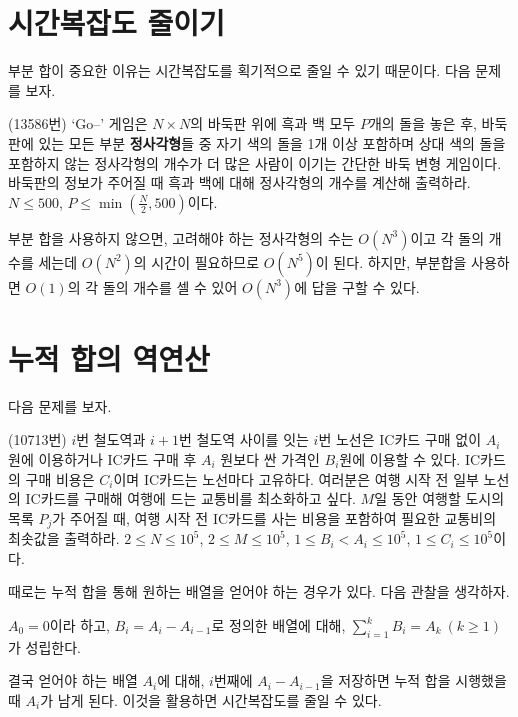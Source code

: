 \section{시간복잡도 줄이기}

부분 합이 중요한 이유는 시간복잡도를 획기적으로 줄일 수 있기 때문이다. 다음 문제를 보자.

\begin{example}
    (13586번) `Go--' 게임은 $N \times N$의 바둑판 위에 흑과 백 모두 $P$개의 돌을 놓은 후, 바둑판에 있는 모든 부분 \textbf{정사각형}들 중 자기 색의 돌을 1개 이상 포함하며 상대 색의 돌을 포함하지 않는 정사각형의 개수가 더 많은 사람이 이기는 간단한 바둑 변형 게임이다. 바둑판의 정보가 주어질 때 흑과 백에 대해 정사각형의 개수를 계산해 출력하라. $N \leq 500$, $P \leq \min(\frac{N}{2}, 500)$이다.
\end{example}

부분 합을 사용하지 않으면, 고려해야 하는 정사각형의 수는 $O(N^3)$이고 각 돌의 개수를 세는데 $O(N^2)$의 시간이 필요하므로 $O(N^5)$이 된다. 하지만, 부분합을 사용하면 $O(1)$의 각 돌의 개수를 셀 수 있어 $O(N^3)$에 답을 구할 수 있다.

\section{누적 합의 역연산}

다음 문제를 보자.

\begin{example}
    (10713번) $i$번 철도역과 $i+1$번 철도역 사이를 잇는 $i$번 노선은 IC카드 구매 없이 $A_i$원에 이용하거나 IC카드 구매 후 $A_i$ 원보다 싼 가격인 $B_i$원에 이용할 수 있다. IC카드의 구매 비용은 $C_i$이며 IC카드는 노선마다 고유하다. 여러분은 여행 시작 전 일부 노선의 IC카드를 구매해 여행에 드는 교통비를 최소화하고 싶다. $M$일 동안 여행할 도시의 목록 $P_j$가 주어질 때, 여행 시작 전 IC카드를 사는 비용을 포함하여 필요한 교통비의 최솟값을 출력하라. $2 \leq N \leq 10^5$, $2 \leq M \leq 10^5$, $1 \leq B_i < A_i \leq 10^5$, $1 \leq C_i \leq 10^5$이다.
\end{example}

때로는 누적 합을 통해 원하는 배열을 얻어야 하는 경우가 있다. 다음 관찰을 생각하자.

\begin{obs}
    $A_0 = 0$이라 하고, $B_i = A_i - A_{i-1}$로 정의한 배열에 대해, $\sum_{i=1}^k B_i = A_k~(k \geq 1)$가 성립한다.
\end{obs}

결국 얻어야 하는 배열 $A_i$에 대해, $i$번째에 $A_i - A_{i-1}$을 저장하면 누적 합을 시행했을 때 $A_i$가 남게 된다. 이것을 활용하면 시간복잡도를 줄일 수 있다.

